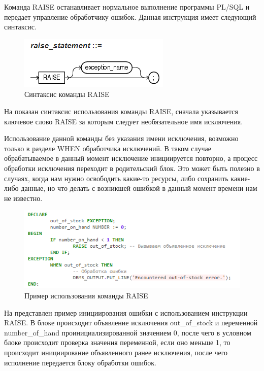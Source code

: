 Команда RAISE останавливает нормальное выполнение программы PL/SQL и передает управление обработчику ошибок. Данная инструкция имеет следующий синтаксис.

\begin{figure}[ht!] 
	\center
	\includegraphics [scale=1] {my_folder/img/C1_raise_syntax}
	\caption{Синтаксис команды RAISE} 
	\label{fig:C1_raise_syntax}  
\end{figure}
\FloatBarrier

На  показан синтаксис использования команды RAISE, сначала указывается ключевое слово RAISE за которым следует необязательное имя исключения. 

Использование данной команды без указания имени исключения, возможно только в разделе WHEN обработчика исключений. В таком случае обрабатываемое в данный момент исключение инициируется повторно, а процесс обработки исключения переходит в родительский блок. Это может быть полезно в случаях, когда нам нужно освободить какие-то ресурсы, либо сохранить какие-либо данные, но что делать с возникшей ошибкой в данный момент времени нам не известно.

\begin{figure}[ht!] 
	\center
	\includegraphics [scale=1] {my_folder/img/C1_raise_example}
	\caption{Пример использования команды RAISE} 
	\label{fig:C1_raise_example}  
\end{figure}
\FloatBarrier

На  представлен пример инициирования ошибки с использованием инструкции RAISE. В блоке происходит объявление исключения out\_of\_stock и переменной number\_of\_hand проинициализированной значением 0, после чего в условном блоке происходит проверка значения переменной, если оно меньше 1, то происходит инициирование объявленного ранее исключения, после чего исполнение передается блоку обработки ошибок. 

